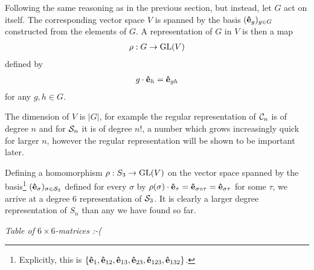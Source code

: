 	Following the same reasoning as in the previous section, but instead, let $G$ act on itself. The corresponding vector space $V$ is spanned by the basis $(\mathbf{\hat{e}}_g)_{g \in G}$ constructed from the elements of $G$. A representation of $G$ in $V$ is then a map
	\begin{align*}
		\rho: G \rightarrow \text{GL}(V)
	\end{align*}
	defined by
	\begin{align*}
		g \cdot \mathbf{\hat{e}}_h = \mathbf{\hat{e}}_{gh}
	\end{align*}
	for any $g,h \in G$.
	
	The dimension of $V$ is $|G|$, for example the regular representation of $\mathcal{C}_n$ is of degree $n$ and for $\mathcal{S}_n$ it is of degree $n!$, a number which grows increasingly quick for larger $n$, however the regular representation will be shown to be important later.
	
	\begin{example}
		Defining a homomorphism $\rho: S_3 \rightarrow \text{GL}(V)$ on the vector space spanned by the basis\footnote{Explicitly, this is $\left\lbrace \mathbf{\hat{e}}_1, \mathbf{\hat{e}}_{12}, \mathbf{\hat{e}}_{13}, \mathbf{\hat{e}}_{23}, \mathbf{\hat{e}}_{123}, \mathbf{\hat{e}}_{132} \right\rbrace$.} $(\mathbf{\hat{e}}_{\sigma})_{\sigma \in \mathcal{S}_3}$ defined for every $\sigma$ by $\rho(\sigma) \cdot \mathbf{\hat{e}}_\tau = \mathbf{\hat{e}}_{\sigma \circ \tau} = \mathbf{\hat{e}}_{\sigma\tau}$ for some $\tau$, we arrive at a degree 6 representation of $\mathcal{S}_3$. It is clearly a larger degree representation of $S_n$ than any we have found so far.%
		
		\textit{Table of $6 \times 6$-matrices :-(}
	\end{example}
	
	


